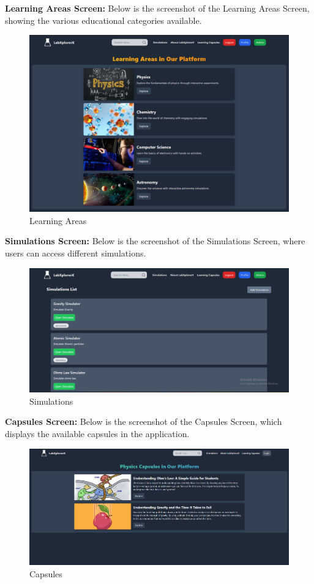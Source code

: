 \textbf{Learning Areas Screen:} Below is the screenshot of the Learning Areas Screen, showing the various educational categories available.
\begin{figure}[H]
    \centering
    \includegraphics[width = 15cm]{Diagrams/output/learningareas.png}
    \caption{Learning Areas}
\end{figure}

\textbf{Simulations Screen:} Below is the screenshot of the Simulations Screen, where users can access different simulations.
\begin{figure}[H]
    \centering
    \includegraphics[width = 15cm]{Diagrams/output/simulations.png}
    \caption{Simulations}
\end{figure}

\textbf{Capsules Screen:} Below is the screenshot of the Capsules Screen, which displays the available capsules in the application.
\begin{figure}[H]
    \centering
    \includegraphics[width = 16cm]{Diagrams/output/capsules.png}
    \caption{Capsules}
\end{figure}

